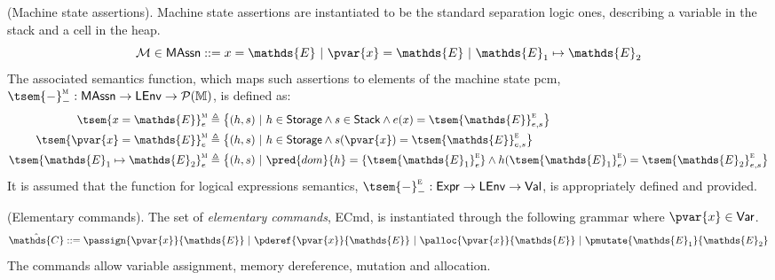 \begin{defn}
	(Machine state assertions).
	Machine state assertions are instantiated to be the standard separation logic ones, describing a variable in the stack and a cell in the heap.
		\[
			\mathcal{M} \in \mathsf{MAssn} ::= x = \mathds{E}\ |\ \pvar{x} = \mathds{E}\ |\ \mathds{E}_1 \mapsto \mathds{E}_2
		\]
		The associated semantics function, which maps such assertions to elements of the machine state pcm, $\tsem{-}_-^\textsc{m} : \mathsf{MAssn} \rightarrow \mathsf{LEnv} \rightarrow \mathcal{P}(\mathbb{M})$, is defined as:
		\begin{align*}
			\tsem{x = \mathds{E}}^\textsc{m}_e &\triangleq \big\{ (h, s)\ |\ h \in \mathsf{Storage} \land s \in \mathsf{Stack} \land  e(x) = \tsem{\mathds{E}}^\textsc{e}_{e, s} \big\}
			\\
			\tsem{\pvar{x} = \mathds{E}}^\textsc{m}_e &\triangleq \big\{ (h, s)\ |\ h \in \mathsf{Storage} \land s(\pvar{x}) = \tsem{\mathds{E}}^\textsc{e}_{e, s} \big\}
			\\
			\tsem{\mathds{E}_1 \mapsto \mathds{E}_2}_e^\textsc{m} &\triangleq \big\{ (h, s)\ |\ \pred{dom}{h} = \{\tsem{\mathds{E}_1}_e^\textsc{e}\} \land h(\tsem{\mathds{E}_1}_e^\textsc{e}) = \tsem{\mathds{E}_2}_{e,s}^\textsc{e} \big\}
		\end{align*}
		It is assumed that the function for logical expressions semantics, $\tsem{-}_-^\textsc{e} : \mathsf{Expr} \rightarrow \mathsf{LEnv} \rightarrow \mathsf{Val}$, is appropriately defined and provided.
\end{defn}

\begin{defn}
	\label{defn:ecmd}
	(Elementary commands).
	The set of \emph{elementary commands}, \textsf{ECmd}, is instantiated through the following grammar where $\pvar{x} \in \mathsf{Var}$.
	\[
		\hat{\mathds{C}} ::=
			\passign{\pvar{x}}{\mathds{E}}\
			|\ \pderef{\pvar{x}}{\mathds{E}}\
			|\ \palloc{\pvar{x}}{\mathds{E}}\
			|\ \pmutate{\mathds{E}_1}{\mathds{E}_2}
	\]
	The commands allow variable assignment, memory dereference, mutation and allocation.
\end{defn}

